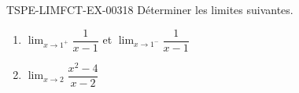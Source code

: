 \begin{exercice}{TSPE-LIMFCT-EX-003}{1}{8}
Déterminer les limites suivantes.
\begin{enumerate}
  \item $\lim_{x \to 1^+} \dfrac{1}{x-1}$ et $\lim_{x \to 1^-} \dfrac{1}{x-1}$
  \item $\lim_{x \to 2} \dfrac{x^2 - 4}{x - 2}$
\end{enumerate}
\end{exercice}
